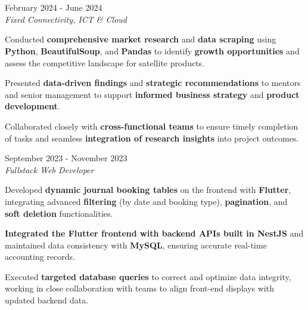 \documentclass[../main.tex]{subfiles}
\begin{document}
\section{}

\begin{twocolentry}{February 2024 - June 2024}
     \\
    \vspace{0.10 cm}
    \textit{Fixed Connectivity, ICT \& Cloud}
\end{twocolentry}

\vspace{0.10 cm}
\begin{onecolentry}
\begin{highlights}
    \item Conducted \textbf{comprehensive market research} and \textbf{data scraping} using \textbf{Python}, \textbf{BeautifulSoup}, and \textbf{Pandas} to identify \textbf{growth opportunities} and assess the competitive landscape for satellite products.
    \item Presented \textbf{data-driven findings} and \textbf{strategic recommendations} to mentors and senior management to support \textbf{informed business strategy} and \textbf{product development}.
    \item Collaborated closely with \textbf{cross-functional teams} to ensure timely completion of tasks and seamless \textbf{integration of research insights} into project outcomes.
\end{highlights}
\end{onecolentry}

\vspace{0.4 cm}

\begin{twocolentry}{September 2023 - November 2023}
     \\
    \vspace{0.10 cm}
    \textit{Fullstack Web Developer}
\end{twocolentry}

\vspace{0.10 cm}
\begin{onecolentry}
\begin{highlights}
    \item Developed \textbf{dynamic journal booking tables} on the frontend with \textbf{Flutter}, integrating advanced \textbf{filtering} (by date and booking type), \textbf{pagination}, and \textbf{soft deletion} functionalities.
    \item \textbf{Integrated the Flutter frontend with backend APIs built in NestJS} and maintained data consistency with \textbf{MySQL}, ensuring accurate real-time accounting records.
    \item Executed \textbf{targeted database queries} to correct and optimize data integrity, working in close collaboration with teams to align front-end displays with updated backend data.
\end{highlights}
\end{onecolentry}
\end{document}
